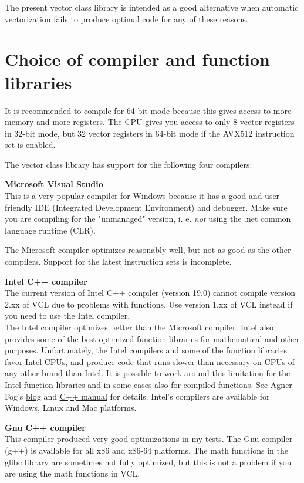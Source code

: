 \documentclass[vcl_manual.tex]{subfiles}
\begin{document}
The present vector class library is intended as a good alternative when automatic vectorization fails to produce optimal code for any of these reasons.


\section{Choice of compiler and function libraries}\label{ChoiceOfCompiler}

It is recommended to compile for 64-bit mode because this gives access to more memory and more registers. The CPU gives you access to only 8 vector registers in 32-bit mode, but 32 vector registers in 64-bit mode if the AVX512 instruction set is enabled.

The vector class library has support for the following four compilers:

\textbf{Microsoft Visual Studio}\\
This is a very popular compiler for Windows because it has a good and user friendly IDE (Integrated Development Environment) and debugger. Make sure you are compiling for the "unmanaged" version, i. e. \emph{not} using the .net common language runtime (CLR).

The Microsoft compiler optimizes reasonably well, but not as good as the other compilers. Support for the latest instruction sets is incomplete.

\textbf{Intel C++ compiler}\\
The current version of Intel C++ compiler (version 19.0) cannot compile version 2.xx of VCL due to problems with  functions. Use version 1.xx of VCL instead if you need to use the Intel compiler.\\
The Intel compiler optimizes better than the Microsoft compiler. Intel also provides some of the best optimized function libraries for mathematical and other purposes. Unfortunately, the Intel compilers and some of the function libraries favor Intel CPUs, and produce code that runs slower than necessary on CPUs of any other brand than Intel. It is possible to work around this limitation for the Intel function libraries and in some cases also for compiled functions. 
See Agner Fog's \href{https://www.agner.org/optimize/blog/read.php?i=49}{blog} 
and \href{https://www.agner.org/optimize/#manual_cpp}{C++ manual} 
for details. Intel's compilers are available for Windows, Linux and Mac platforms.

\textbf{Gnu C++ compiler}\\
This compiler produced very good optimizations in my tests. The Gnu compiler (g++) is available for all x86 and x86-64 platforms. The math functions in the glibc library are sometimes not fully optimized, but this is not a problem if you are using the math functions in VCL.
\end{document}
